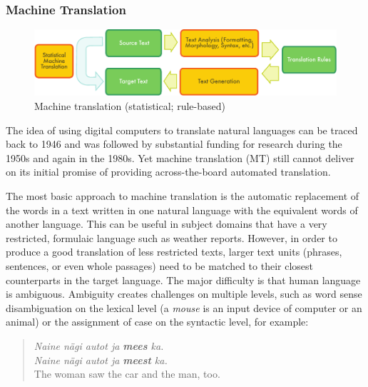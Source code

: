 \begin{multicols}{2}
\subsubsection{Machine Translation}

\begin{figure}[htb]
  \center
  \includegraphics[width=\textwidth]{../_media/english/machine_translation}
  \caption{Machine translation (statistical; rule-based)}
  \label{fig:mtarch_en}
\end{figure}

The idea of using digital computers to translate natural languages can be traced back to 1946 and was followed by substantial funding for research during the 1950s and again in the 1980s. 
Yet machine translation (MT) still cannot deliver on its initial promise of providing across-the-board automated translation.  


The most basic approach to machine translation is the automatic replacement of the words in a text written in one natural language with the equivalent words of another language. This can be useful in subject domains that have a very restricted, formulaic language such as weather reports.
However, in order to produce a good translation of less restricted texts, larger text units (phrases, sentences, or even whole passages) need to be matched to their closest counterparts in the target language. The major difficulty is that human language is ambiguous. Ambiguity creates challenges on multiple levels, such as word sense disambiguation on the lexical level (a \textit{mouse} is an input device of computer or an animal) or the assignment of case on the syntactic level, for example:

\begin{quote}
\textit{Naine nägi autot ja \textbf{mees} ka.}\\
\textit{Naine nägi autot ja \textbf{meest} ka.}\\
The woman saw the car and the man, too.
\end{quote}


\end{multicols}
